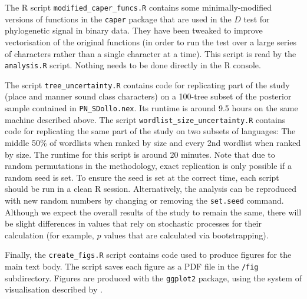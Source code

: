 The R script \texttt{modified\_caper\_funcs.R} contains some
minimally-modified versions of functions in the \texttt{caper} package
that are used in the \(D\) test for phylogenetic signal in binary data.
They have been tweaked to improve vectorisation of the original
functions (in order to run the test over a large series of characters
rather than a single character at a time). This script is read by the
\texttt{analysis.R} script. Nothing needs to be done directly in the R
console.

The script \texttt{tree\_uncertainty.R} contains code for replicating
part of the study (place and manner sound class characters) on a
100-tree subset of the posterior sample contained in
\texttt{PN\_SDollo.nex}. Its runtime is around 9.5 hours on the same
machine described above. The script
\texttt{wordlist\_size\_uncertainty.R} contains code for replicating the
same part of the study on two subsets of languages: The middle 50\% of
wordlists when ranked by size and every 2nd wordlist when ranked by
size. The runtime for this script is around 20 minutes. Note that due to
random permutations in the methodology, exact replication is only
possible if a random seed is set. To ensure the seed is set at the
correct time, each script should be run in a clean R session.
Alternatively, the analysis can be reproduced with new random numbers by
changing or removing the \texttt{set.seed} command. Although we expect
the overall results of the study to remain the same, there will be
slight differences in values that rely on stochastic processes for their
calculation (for example, \(p\) values that are calculated via
bootstrapping).

Finally, the \texttt{create\_figs.R} script contains code used to
produce figures for the main text body. The script saves each figure as
a PDF file in the \texttt{/fig} subdirectory. Figures are produced with
the \texttt{ggplot2} package, using the system of visualisation
described by \textcite{wilkinson_grammar_2005}.


